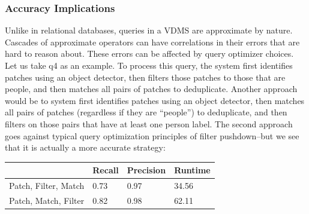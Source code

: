 \subsubsection{Accuracy Implications}
Unlike in relational databases, queries in a VDMS are approximate by nature.
Cascades of approximate operators can have correlations in their errors that are hard to reason about.
These errors can be affected by query optimizer choices.
Let us take q4 as an example.
To process this query, the system first identifies patches using an object detector, then filters those patches to those that are people, and then matches all pairs of patches to deduplicate.
Another approach would be to  system first identifies patches using an object detector, then matches all pairs of patches (regardless if they are ``people'') to deduplicate, and then filters on those pairs that have at least one person label.
The second approach goes against typical query optimization principles of filter pushdown--but we see that it is actually a more accurate strategy:

\begin{table}[]
\begin{tabular}{|l|l|l|l|}
\hline
& Recall               & Precision & Runtime         \\
\hline
Patch, Filter, Match & 0.73      & 0.97    & 34.56  \\
Patch, Match, Filter & 0.82      & 0.98    & 62.11  \\
\hline
\end{tabular}
\end{table}


